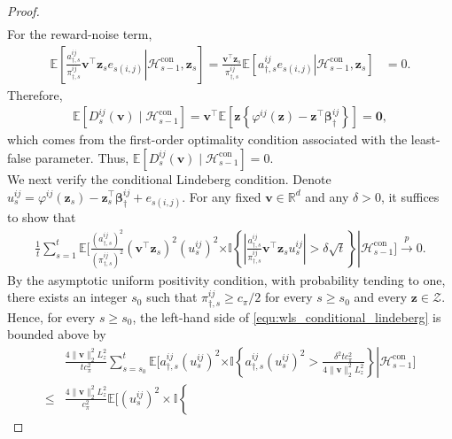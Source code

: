 \documentclass[12pt]{article}
\begin{document}
\begin{proof}
\begin{align*}
\end{align*} 
For the reward-noise term, 
\begin{align*} 
\mathbb E \left[ \left. \frac{ a_{\dagger,s}^{ij} }{ \pi_{\dagger,s}^{ij} } \bm v^\top\bm z_s e_{s(i,j)} \right| \mathcal H_{s-1}^{\mathrm{con}}, \bm z_s \right] = \frac{ \bm v^\top\bm z_s }{ \pi_{\dagger,s}^{ij} } \mathbb E \left[ \left. a_{\dagger,s}^{ij}e_{s(i,j)} \right| \mathcal H_{s-1}^{\mathrm{con}}, \bm z_s \right] &= 0. 
\end{align*} 
Therefore, 
\begin{align*} 
\mathbb E \left[ D_s^{ij}(\bm v) \mid \mathcal H_{s-1}^{\mathrm{con}} \right] = \bm v^\top \mathbb E \left[ \bm z \left\{ \varphi^{ij}(\bm z) - \bm z^\top\bm\beta_\dagger^{ij} \right\} \right] = \bm 0, 
\end{align*} 
which comes from the first-order optimality condition associated with the least-false parameter. Thus, $\mathbb E \left[ D_s^{ij}(\bm v) \mid \mathcal H_{s-1}^{\mathrm{con}} \right] = 0$.  \\
We next verify the conditional Lindeberg condition. Denote $u_s^{ij}=\varphi^{ij}(\bm z_s)-\bm z_s^\top\bm\beta_\dagger^{ij}+e_{s(i,j)}$.
For any fixed $\bm v\in\mathbb R^d$ and any $\delta>0$, it suffices to show that
\begin{align}
\label{equ:wls_conditional_lindeberg}
\frac{1}{t}
\sum_{s=1}^t
\mathbb E
\Bigg[
\left.
\frac{(a_{\dagger,s}^{ij})^2}{(\pi_{\dagger,s}^{ij})^2}
(\bm v^\top\bm z_s)^2 (u_s^{ij})^2
\right.
\left.
\times
\mathbb I
\left\{
\left|
\frac{a_{\dagger,s}^{ij}}{\pi_{\dagger,s}^{ij}}
\bm v^\top\bm z_s
u_s^{ij}
\right|
>
\delta\sqrt t
\right\}
\right|
\mathcal H_{s-1}^{\mathrm{con}}
\Bigg]
\stackrel{p}{\to} 0.
\end{align}
By the asymptotic uniform positivity condition, with probability tending to one, there exists an integer $s_0$ such that $\pi_{\dagger,s}^{ij}\ge {c_\pi}/{2}$ for every $s\ge s_0$ and every $\bm z\in\mathcal Z$. Hence, for every $s\ge s_0$, the left-hand side of
\eqref{equ:wls_conditional_lindeberg} is bounded above by
\begin{align*}
&\frac{4\|\bm v\|_2^2L_z^2}{tc_\pi^2}
\sum_{s=s_0}^t
\mathbb E
\Bigg[
\left.
a_{\dagger,s}^{ij}
(u_s^{ij})^2
\right.
\left.
\times
\mathbb I
\left\{
a_{\dagger,s}^{ij}
(u_s^{ij})^2 >
\frac{\delta^2tc_\pi^2}{4\|\bm v\|_2^2L_z^2}
\right\}
\right|
\mathcal H_{s-1}^{\mathrm{con}}
\Bigg] \\
\le &
\frac{4\|\bm v\|_2^2L_z^2}{c_\pi^2}
\mathbb E
\Bigg[
(u_s^{ij})^2
\times
\mathbb I
\left\{

\end{align*}
\end{proof}
\end{document}
